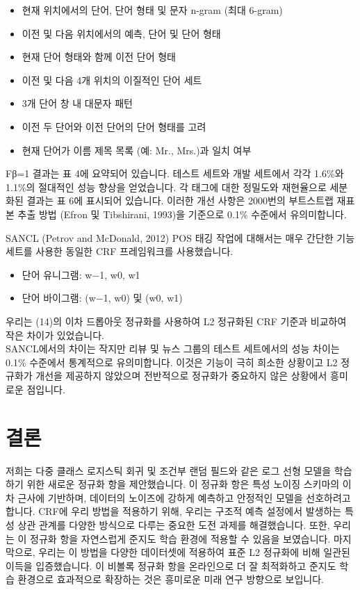 \documentclass{article}
\begin{document}
\begin{itemize}
    \item 현재 위치에서의 단어, 단어 형태 및 문자 n-gram (최대 6-gram)
    \item 이전 및 다음 위치에서의 예측, 단어 및 단어 형태
    \item 현재 단어 형태와 함께 이전 단어 형태
    \item 이전 및 다음 4개 위치의 이질적인 단어 세트
    \item 3개 단어 창 내 대문자 패턴
    \item 이전 두 단어와 이전 단어의 단어 형태를 고려
    \item 현재 단어가 이름 제목 목록 (예: Mr., Mrs.)과 일치 여부
\end{itemize}
Fβ=1 결과는 표 4에 요약되어 있습니다. 테스트 세트와 개발 세트에서 각각 1.6\%와 1.1\%의 절대적인 성능 향상을 얻었습니다. 각 태그에 대한 정밀도와 재현율으로 세분화된 결과는 표 6에 표시되어 있습니다. 이러한 개선 사항은 2000번의 부트스트랩 재표본 추출 방법 (Efron 및 Tibshirani, 1993)을 기준으로 0.1\% 수준에서 유의미합니다.

SANCL (Petrov and McDonald, 2012) POS 태깅 작업에 대해서는 매우 간단한 기능 세트를 사용한 동일한 CRF 프레임워크를 사용했습니다.
\begin{itemize}
    \item 단어 유니그램: w−1, w0, w1
    \item 단어 바이그램: (w−1, w0) 및 (w0, w1)
\end{itemize}
우리는 (14)의 이차 드롭아웃 정규화를 사용하여 L2 정규화된 CRF 기준과 비교하여 작은 차이가 있었습니다.\\
SANCL에서의 차이는 작지만 리뷰 및 뉴스 그룹의 테스트 세트에서의 성능 차이는 0.1\% 수준에서 통계적으로 유의미합니다. 이것은 기능이 극히 희소한 상황이고 L2 정규화가 개선을 제공하지 않았으며 전반적으로 정규화가 중요하지 않은 상황에서 흥미로운 점입니다.

\section{결론}
저희는 다중 클래스 로지스틱 회귀 및 조건부 랜덤 필드와 같은 로그 선형 모델을 학습하기 위한 새로운 정규화 항을 제안했습니다. 이 정규화 항은 특성 노이징 스키마의 이차 근사에 기반하며, 데이터의 노이즈에 강하게 예측하고 안정적인 모델을 선호하려고 합니다. CRF에 우리 방법을 적용하기 위해, 우리는 구조적 예측 설정에서 발생하는 특성 상관 관계를 다양한 방식으로 다루는 중요한 도전 과제를 해결했습니다. 또한, 우리는 이 정규화 항을 자연스럽게 준지도 학습 환경에 적용할 수 있음을 보였습니다. 마지막으로, 우리는 이 방법을 다양한 데이터셋에 적용하여 표준 L2 정규화에 비해 일관된 이득을 입증했습니다. 이 비볼록 정규화 항을 온라인으로 더 잘 최적화하고 준지도 학습 환경으로 효과적으로 확장하는 것은 흥미로운 미래 연구 방향으로 보입니다.
\end{document}
